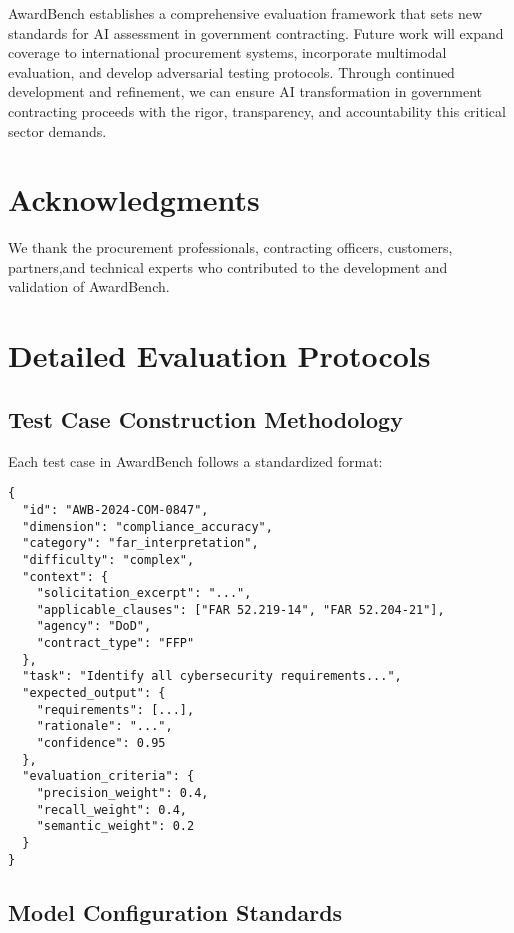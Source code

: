 \documentclass[11pt,a4paper]{article}
\begin{document}
AwardBench establishes a comprehensive evaluation framework that sets new standards for AI assessment in government contracting. Future work will expand coverage to international procurement systems, incorporate multimodal evaluation, and develop adversarial testing protocols. Through continued development and refinement, we can ensure AI transformation in government contracting proceeds with the rigor, transparency, and accountability this critical sector demands.

\section*{Acknowledgments}

We thank the procurement professionals, contracting officers, customers, partners,and technical experts who contributed to the development and validation of AwardBench.




\appendix

\section{Detailed Evaluation Protocols}
\label{app:protocols}

\subsection{Test Case Construction Methodology}

Each test case in AwardBench follows a standardized format:

\begin{lstlisting}[basicstyle=\small]
{
  "id": "AWB-2024-COM-0847",
  "dimension": "compliance_accuracy",
  "category": "far_interpretation",
  "difficulty": "complex",
  "context": {
    "solicitation_excerpt": "...",
    "applicable_clauses": ["FAR 52.219-14", "FAR 52.204-21"],
    "agency": "DoD",
    "contract_type": "FFP"
  },
  "task": "Identify all cybersecurity requirements...",
  "expected_output": {
    "requirements": [...],
    "rationale": "...",
    "confidence": 0.95
  },
  "evaluation_criteria": {
    "precision_weight": 0.4,
    "recall_weight": 0.4,
    "semantic_weight": 0.2
  }
}
\end{lstlisting}

\subsection{Model Configuration Standards}
\end{document}
